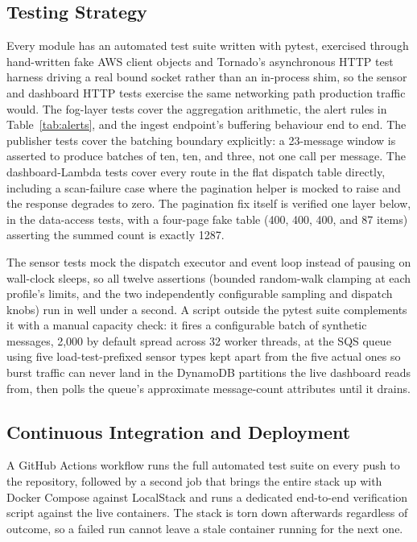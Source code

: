 \documentclass[conference]{IEEEtran}
\begin{document}
\subsection{Testing Strategy}
Every module has an automated test suite written with pytest, exercised through hand-written fake AWS client objects and Tornado's asynchronous HTTP test harness driving a real bound socket rather than an in-process shim, so the sensor and dashboard HTTP tests exercise the same networking path production traffic would. The fog-layer tests cover the aggregation arithmetic, the alert rules in Table~\ref{tab:alerts}, and the ingest endpoint's buffering behaviour end to end. The publisher tests cover the batching boundary explicitly: a 23-message window is asserted to produce batches of ten, ten, and three, not one call per message. The dashboard-Lambda tests cover every route in the flat dispatch table directly, including a scan-failure case where the pagination helper is mocked to raise and the response degrades to zero. The pagination fix itself is verified one layer below, in the data-access tests, with a four-page fake table (400, 400, 400, and 87 items) asserting the summed count is exactly 1287.

The sensor tests mock the dispatch executor and event loop instead of pausing on wall-clock sleeps, so all twelve assertions (bounded random-walk clamping at each profile's limits, and the two independently configurable sampling and dispatch knobs) run in well under a second. A script outside the pytest suite complements it with a manual capacity check: it fires a configurable batch of synthetic messages, 2,000 by default spread across 32 worker threads, at the SQS queue using five load-test-prefixed sensor types kept apart from the five actual ones so burst traffic can never land in the DynamoDB partitions the live dashboard reads from, then polls the queue's approximate message-count attributes until it drains.

\subsection{Continuous Integration and Deployment}
A GitHub Actions workflow runs the full automated test suite on every push to the repository, followed by a second job that brings the entire stack up with Docker Compose against LocalStack and runs a dedicated end-to-end verification script against the live containers. The stack is torn down afterwards regardless of outcome, so a failed run cannot leave a stale container running for the next one.
\end{document}
